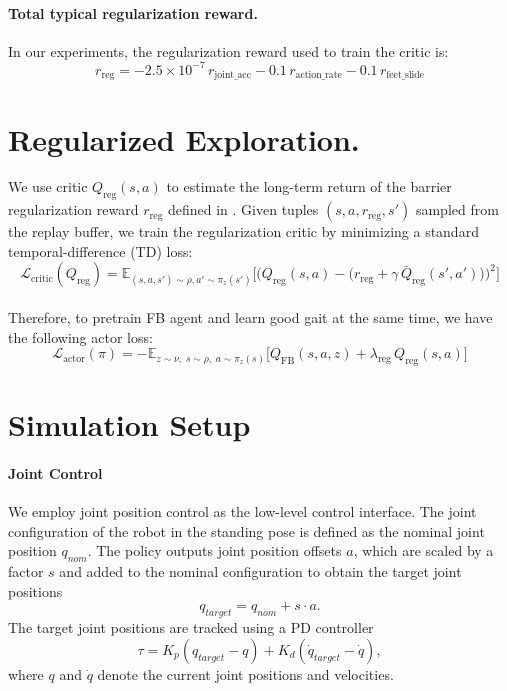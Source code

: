 \paragraph{Total typical regularization reward.}
In our experiments, the regularization reward used to train the critic is:
\begin{equation}
r_{\text{reg}} =
-2.5\times 10^{-7}\, r_{\text{joint\_acc}}
-0.1\, r_{\text{action\_rate}}
-0.1\, r_{\text{feet\_slide}}
\end{equation}


\section{Regularized Exploration.}
\label{appendix:qregu}
We use critic $Q_{\text{reg}}(s,a)$ to estimate the long-term return of the barrier regularization reward $r_{\text{reg}}$ defined in . Given tuples $(s,a,r_{\text{reg}},s')$ sampled from the replay buffer, we train the regularization critic by minimizing a standard temporal-difference (TD) loss:
\begin{equation}
\mathcal{L}_{\text{critic}}(Q_\text{reg})
=
\mathbb{E}_{ (s,a,s')\sim \rho,a'\sim\pi_z (s')}\Big[
\big(
Q_{\text{reg}}(s,a)
-
\big(r_{\text{reg}}
+
\gamma \,
\bar Q_{\text{reg}}(s', a')
\big)
\big)^2
\Big]
\label{eq:reg_critic_loss}
\end{equation}
\\
Therefore, to pretrain FB agent and learn good gait at the same time, we have the following actor loss:
\begin{equation}
\mathcal{L}_{\text{actor}}(\pi)
=
-\mathbb{E}_{z\sim\nu,\; s\sim\rho,\; a\sim\pi_z(s)}\Big[
Q_{\text{FB}}(s,a,z)
+
\lambda_{\text{reg}}\,
Q_{\text{reg}}(s,a)
\Big]
\end{equation}

\newpage %
\section{Simulation Setup}

\paragraph{Joint Control}
We employ joint position control as the low-level control interface. The joint configuration of the robot in the standing pose is defined as the nominal joint position $q_{nom}$. The policy outputs joint position offsets $a$, which are scaled by a factor $s$ and added to the nominal configuration to obtain the target joint positions
\begin{equation}
q_{target} = q_{nom} + s \cdot a .
\end{equation}
The target joint positions are tracked using a PD controller
\begin{equation}
\tau = K_p (q_{target} - q) + K_d (\dot{q}_{target} - \dot{q}),
\end{equation}
where $q$ and $\dot q$ denote the current joint positions and velocities.

